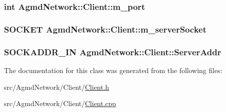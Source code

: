 \hypertarget{class_agmd_network_1_1_client_a6c607b962a694c76f8b8ce1713d0c193}{
\subsubsection[{m\+\_\+port}]{\setlength{\rightskip}{0pt plus 5cm}int Agmd\+Network\+::\+Client\+::m\+\_\+port\hspace{0.3cm}{\ttfamily [protected]}}}\label{class_agmd_network_1_1_client_a6c607b962a694c76f8b8ce1713d0c193}
\hypertarget{class_agmd_network_1_1_client_abf2e8692a26e29cfc09c265c55fb88b5}{
\subsubsection[{m\+\_\+server\+Socket}]{\setlength{\rightskip}{0pt plus 5cm}S\+O\+C\+K\+E\+T Agmd\+Network\+::\+Client\+::m\+\_\+server\+Socket\hspace{0.3cm}{\ttfamily [protected]}}}\label{class_agmd_network_1_1_client_abf2e8692a26e29cfc09c265c55fb88b5}
\hypertarget{class_agmd_network_1_1_client_a28423b5e61474fd608cf45b9d8b529b0}{
\subsubsection[{Server\+Addr}]{\setlength{\rightskip}{0pt plus 5cm}S\+O\+C\+K\+A\+D\+D\+R\+\_\+\+I\+N Agmd\+Network\+::\+Client\+::\+Server\+Addr\hspace{0.3cm}{\ttfamily [protected]}}}\label{class_agmd_network_1_1_client_a28423b5e61474fd608cf45b9d8b529b0}


The documentation for this class was generated from the following files\+:\begin{DoxyCompactItemize}
\item 
src/\+Agmd\+Network/\+Client/\hyperlink{_client_8h}{Client.\+h}\item 
src/\+Agmd\+Network/\+Client/\hyperlink{_client_8cpp}{Client.\+cpp}\end{DoxyCompactItemize}
